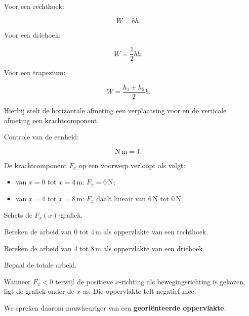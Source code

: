 \documentclass{ximera}
\begin{document}
Voor een rechthoek:

\[
W=bh.
\]

Voor een driehoek:

\[
W=\frac12bh.
\]

Voor een trapezium:

\[
W=\frac{h_1+h_2}{2}b.
\]

Hierbij stelt de horizontale afmeting een verplaatsing voor en de verticale
afmeting een krachtcomponent.

Controle van de eenheid:

\[
\mathrm{N\,m}=\mathrm J.
\]


\begin{oefening}{\oefB\ESS}

De krachtcomponent $F_x$ op een voorwerp verloopt als volgt:

\begin{itemize}
  \item van $x=0$ tot $x=4\,\mathrm m$: $F_x=6\,\mathrm N$;
  \item van $x=4$ tot $x=8\,\mathrm m$: $F_x$ daalt lineair van
        $6\,\mathrm N$ tot $0\,\mathrm N$.
\end{itemize}

\begin{question}
Schets de $F_x(x)$-grafiek.
\end{question}

\begin{question}
Bereken de arbeid van $0$ tot $4\,\mathrm m$ als oppervlakte van een rechthoek.
\end{question}

\begin{question}
Bereken de arbeid van $4$ tot $8\,\mathrm m$ als oppervlakte van een driehoek.
\end{question}

\begin{question}
Bepaal de totale arbeid.
\end{question}

\end{oefening}



Wanneer $F_x<0$ terwijl de positieve $x$-richting als bewegingsrichting is
gekozen, ligt de grafiek onder de $x$-as. Die oppervlakte telt negatief mee.

We spreken daarom nauwkeuriger van een \textbf{georiënteerde oppervlakte}.
\end{document}
